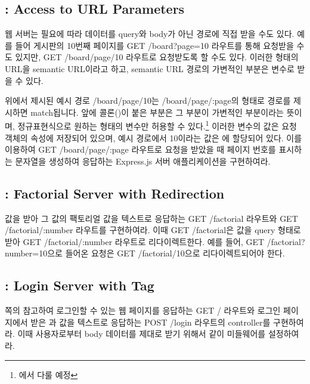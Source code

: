 \subsection*{: Access to URL Parameters}

웹 서버는 필요에 따라 데이터를 query와 body가 아닌 경로에 직접 받을 수도 있다. 예를 들어 게시판의 10번째 페이지를 GET /board?page=10 라우트를 통해 요청받을 수도 있지만, GET /board/page/10 라우트로 요청받도록 할 수도 있다. 이러한 형태의 URL을 semantic URL이라고 하고, semantic URL 경로의 가변적인 부분은 변수로 받을 수 있다.

위에서 제시된 예시 경로 /board/page/10는 /board/page/:page의 형태로 경로를 제시하면 match됩니다. 앞에 콜론(\cd{:})이 붙은 부분은 그 부분이 가변적인 부분이라는 뜻이며, 정규표현식으로 원하는 형태의 변수만 허용할 수 있다.\footnote{에서 다룰 예정} 이러한 변수의 값은 요청 객체의  속성에 저장되어 있으며, 예시 경로에서 10이라는 값은 에 할당되어 있다. 이를 이용하여 GET /board/page/:page 라우트로 요청을 받았을 때 페이지 번호를 표시하는 문자열을 생성하여 응답하는 Express.js 서버 애플리케이션을 구현하여라.


\subsection*{: Factorial Server with Redirection}

 값을 받아 그 값의 팩토리얼 값을 텍스트로 응답하는 GET /factorial 라우트와 GET /factorial/:number 라우트를 구현하여라. 이때 GET /factorial은  값을 query 형태로 받아 GET /factorial/:number 라우트로 리다이렉트한다. 예를 들어, GET /factorial?number=10으로 들어온 요청은 GET /factorial/10으로 리다이렉트되어야 한다.

\subsection*{: Login Server with  Tag}

\pageref{code:form-tag}쪽의 \를 참고하여 로그인할 수 있는 웹 페이지를 응답하는 GET / 라우트와 로그인 페이지에서 받은 과  값을 텍스트로 응답하는 POST /login 라우트의 controller를 구현하여라. 이때 사용자로부터 body 데이터를 제대로 받기 위해서 \와 같이 미들웨어를 설정하여라.
